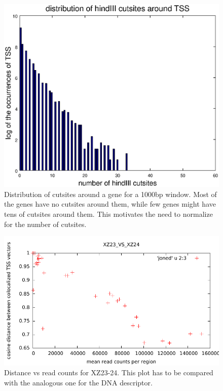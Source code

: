 \documentclass[11pt,a4paper]{article}
\begin{document}
\begin{figure}
\centering
\includegraphics[scale=0.5]{distro_of_cutsites_around_TSS.eps}
\caption{Distribution of cutsites around a gene for a 1000bp window. Most of the genes have no cutsites around them, while few genes might have tens of cutsites around them. This motivates the need to normalize for the number of cutsites.}
\label{fig:cutsite_distro}
\end{figure}

\begin{figure}
\centering
\includegraphics[scale=1]{distance_tss_noise.pdf}
\caption{Distance vs read counts for XZ23-24. This plot has to be compared with the analogous one for the DNA descriptor.}
\label{fig:noisetss}
\end{figure}
\end{document}

